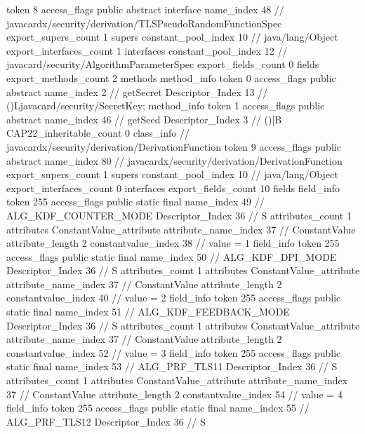 {{{			token	8
			access_flags	public abstract interface
			name_index	48		// javacardx/security/derivation/TLSPseudoRandomFunctionSpec
			export_supers_count	1
			supers {
				constant_pool_index	10		// java/lang/Object
			}
			export_interfaces_count	1
			interfaces {
				constant_pool_index	12		// javacard/security/AlgorithmParameterSpec
			}
			export_fields_count	0
			fields {
			}
			export_methods_count	2
			methods {
				method_info {
					token	0
					access_flags	public abstract
					name_index	2		// getSecret
					Descriptor_Index	13		// ()Ljavacard/security/SecretKey;
				}
				method_info {
					token	1
					access_flags	public abstract
					name_index	46		// getSeed
					Descriptor_Index	3		// ()[B
				}
			}
			CAP22_inheritable_count	0
		}
		class_info {		// javacardx/security/derivation/DerivationFunction
			token	9
			access_flags	public abstract
			name_index	80		// javacardx/security/derivation/DerivationFunction
			export_supers_count	1
			supers {
				constant_pool_index	10		// java/lang/Object
			}
			export_interfaces_count	0
			interfaces {
			}
			export_fields_count	10
			fields {
			field_info {
				token	255
				access_flags	public static final
				name_index	49		// ALG_KDF_COUNTER_MODE
				Descriptor_Index	36		// S
				attributes_count	1
				attributes {
				ConstantValue_attribute {
					attribute_name_index	37		// ConstantValue
					attribute_length	2
					constantvalue_index	38		// value = 1
				}
				}
			}
			field_info {
				token	255
				access_flags	public static final
				name_index	50		// ALG_KDF_DPI_MODE
				Descriptor_Index	36		// S
				attributes_count	1
				attributes {
				ConstantValue_attribute {
					attribute_name_index	37		// ConstantValue
					attribute_length	2
					constantvalue_index	40		// value = 2
				}
				}
			}
			field_info {
				token	255
				access_flags	public static final
				name_index	51		// ALG_KDF_FEEDBACK_MODE
				Descriptor_Index	36		// S
				attributes_count	1
				attributes {
				ConstantValue_attribute {
					attribute_name_index	37		// ConstantValue
					attribute_length	2
					constantvalue_index	52		// value = 3
				}
				}
			}
			field_info {
				token	255
				access_flags	public static final
				name_index	53		// ALG_PRF_TLS11
				Descriptor_Index	36		// S
				attributes_count	1
				attributes {
				ConstantValue_attribute {
					attribute_name_index	37		// ConstantValue
					attribute_length	2
					constantvalue_index	54		// value = 4
				}
				}
			}
			field_info {
				token	255
				access_flags	public static final
				name_index	55		// ALG_PRF_TLS12
				Descriptor_Index	36		// S
}}}}}
